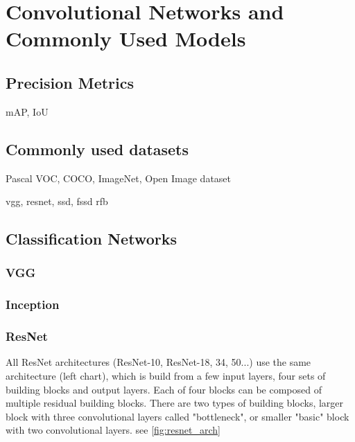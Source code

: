 \chapter{Convolutional Networks and Commonly Used Models}
\label{chapt:models}
\section{Precision Metrics}
mAP, IoU

\section{Commonly used datasets}
\label{datasets}
Pascal VOC, COCO, ImageNet, Open Image dataset

 vgg, resnet, ssd, fssd rfb

\section{Classification Networks}
\subsection{VGG}
\label{VGG}
\subsection{Inception}
\label{inception}
\subsection{ResNet}
\label{resnet}

All ResNet architectures (ResNet-10, ResNet-18, 34, 50...) use the same architecture (left chart), which is build from a few input layers, four sets of building blocks and output layers. Each of four blocks can be composed of multiple residual building blocks. There are two types of building blocks, larger block with three convolutional layers called "bottleneck", or smaller "basic" block with two convolutional layers.  see \cref{fig:resnet_arch}

